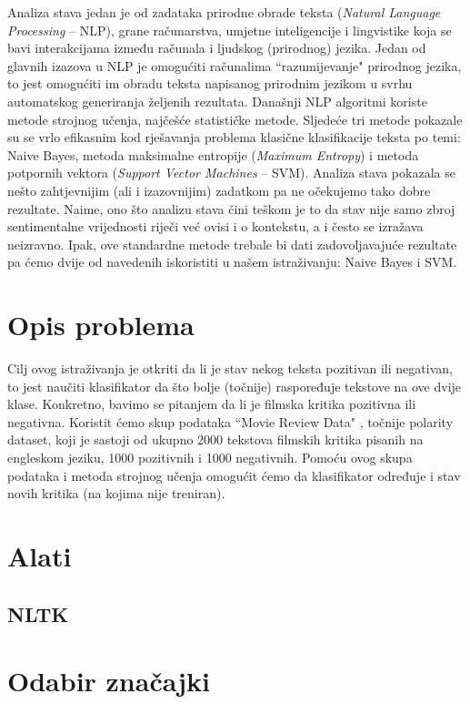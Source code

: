 \documentclass[conference]{IEEEtran}
\begin{document}
Analiza stava jedan je od zadataka prirodne obrade teksta (\textit{Natural Language Processing} -- NLP), grane računarstva, umjetne inteligencije i lingvistike koja se bavi interakcijama između računala i ljudskog (prirodnog) jezika. Jedan od glavnih izazova u NLP je omogućiti računalima ``razumijevanje" prirodnog jezika, to jest omogućiti im obradu teksta napisanog prirodnim jezikom u svrhu automatskog generiranja željenih rezultata. Današnji NLP algoritmi koriste metode strojnog učenja, najčešće statističke metode. Sljedeće tri metode pokazale su se vrlo efikasnim kod rješavanja problema klasične klasifikacije teksta po temi: Naive Bayes, metoda maksimalne entropije (\textit{Maximum Entropy}) i metoda potpornih vektora (\textit{Support Vector Machines} -- SVM). Analiza stava pokazala se nešto zahtjevnijim (ali i izazovnijim) zadatkom pa ne očekujemo tako dobre rezultate. Naime, ono što analizu stava čini teškom je to da stav nije samo zbroj sentimentalne vrijednosti riječi već ovisi i o kontekstu, a i često se izražava neizravno. Ipak, ove standardne metode trebale bi dati zadovoljavajuće rezultate pa ćemo dvije od navedenih iskoristiti u našem istraživanju: Naive Bayes i SVM.

\section{Opis problema}

Cilj ovog istraživanja je otkriti da li je stav nekog teksta pozitivan ili negativan, to jest naučiti klasifikator da što bolje (točnije) raspoređuje tekstove na ove dvije klase. Konkretno, bavimo se pitanjem da li je filmska kritika pozitivna ili negativna. Koristit ćemo skup podataka ``Movie Review Data" \cite{dataset}, točnije polarity dataset, koji je sastoji od ukupno 2000 tekstova filmskih kritika pisanih na engleskom jeziku, 1000 pozitivnih i 1000 negativnih. Pomoću ovog skupa podataka i metoda strojnog učenja omogućit ćemo da klasifikator određuje i stav novih kritika (na kojima nije treniran).

\section{Alati}

\subsection{NLTK}

\section{Odabir značajki}
\end{document}
